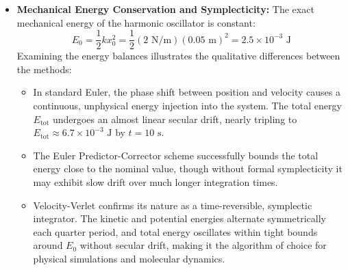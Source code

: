 \documentclass[11pt,a4paper]{article}
\begin{document}
\begin{itemize}
    \item \textbf{Mechanical Energy Conservation and Symplecticity:}
    The exact mechanical energy of the harmonic oscillator is constant:
    \begin{equation}
        E_0 = \frac{1}{2} k x_0^2 = \frac{1}{2} (2\text{ N/m}) (0.05\text{ m})^2 = 2.5 \times 10^{-3}\text{ J}
    \end{equation}
    Examining the energy balances illustrates the qualitative differences between the methods:
    \begin{itemize}
        \item In standard Euler, the phase shift between position and velocity causes a continuous, unphysical energy injection into the system. The total energy $E_{\text{tot}}$ undergoes an almost linear secular drift, nearly tripling to $E_{\text{tot}} \approx 6.7 \times 10^{-3}\text{ J}$ by $t = 10\text{ s}$.
        \item The Euler Predictor-Corrector scheme successfully bounds the total energy close to the nominal value, though without formal symplecticity it may exhibit slow drift over much longer integration times.
        \item Velocity-Verlet confirms its nature as a time-reversible, symplectic integrator. The kinetic and potential energies alternate symmetrically each quarter period, and total energy oscillates within tight bounds around $E_0$ without secular drift, making it the algorithm of choice for physical simulations and molecular dynamics.
    \end{itemize}
\end{itemize}
\end{document}
